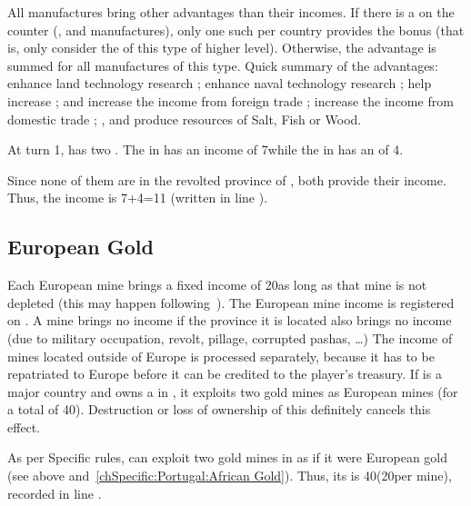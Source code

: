 \aparag All manufactures bring other advantages than their incomes.
\bparag If there is a \textetoile on the counter (,
 and  manufactures), only one such \MNU per
country provides the bonus (that is, only consider the \MNU of this type
of higher level).
\bparag Otherwise, the advantage is summed for all manufactures of this
type.
\bparag Quick summary of the advantages:  \MNU enhance land
technology research ;  \MNU enhance naval technology
research ;  \MNU help increase \STAB ;  and 
\MNU increase the income from foreign trade ;  \MNU increase
the income from domestic trade ; ,  and 
\MNU produce resources of Salt, Fish or Wood.

\begin{exemple}
  At turn 1, \POR has two \MNU. The  \MNU in
  \provinceTejo has an income of 7\ducats while the  \MNU in
   has an of 4\ducats.

  Since none of them are in the revolted province of \provinceBeira,
  both provide their income. Thus, the income is 7+4=11\ducats
  (written in line ).
\end{exemple}

\subsection{European Gold}
\aparag Each European mine brings a fixed income of 20\ducats as long as
that mine is not depleted (this may happen following~). The European mine income is registered on
.
\bparag A mine brings no income if the province it is located also
brings no income (due to military occupation, revolt, pillage,
corrupted pashas, \ldots)
\aparag The income of mines located outside of Europe is processed
separately, because it has to be repatriated to Europe before it can be
credited to the player's treasury.
 If \POR is a major country
and owns a \TP in , it exploits two gold mines
as European mines (for a total of 40\ducats). Destruction or loss of
ownership of this \TP definitely cancels this effect.

\begin{exemple}
  As per Specific rules, \POR can exploit two gold mines in
   as if it were European gold (see above
  and~\ref{chSpecific:Portugal:African Gold}). Thus, its  is 40\ducats (20\ducats per mine), recorded in line
  .
\end{exemple}

